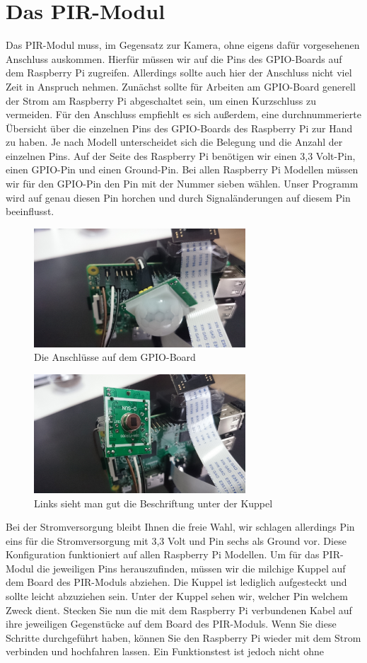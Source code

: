 \documentclass[12pt,a4paper]{scrreprt}
\begin{document}
\section{Das PIR-Modul} 
Das PIR-Modul muss, im Gegensatz zur Kamera, ohne eigens dafür vorgesehenen Anschluss auskommen. Hierfür müssen wir auf die Pins des GPIO-Boards auf dem Raspberry Pi zugreifen. Allerdings sollte auch hier der Anschluss nicht viel Zeit in Anspruch nehmen. Zunächst sollte für Arbeiten am GPIO-Board generell der Strom am Raspberry Pi abgeschaltet sein, um einen Kurzschluss zu vermeiden. Für den Anschluss empfiehlt es sich außerdem, eine durchnummerierte Übersicht über die einzelnen Pins des GPIO-Boards des Raspberry Pi zur Hand zu haben. Je nach Modell unterscheidet sich die Belegung und die Anzahl der einzelnen Pins. Auf der Seite des Raspberry Pi benötigen wir einen 3,3 Volt-Pin, einen GPIO-Pin und einen Ground-Pin. Bei allen Raspberry Pi Modellen müssen wir für den GPIO-Pin den Pin mit der Nummer sieben wählen. Unser Programm wird auf genau diesen Pin horchen und durch Signaländerungen auf diesem Pin beeinflusst. \begin{figure}[h] \centering \includegraphics[width = 7.9cm]{pir1.JPG} \caption{Die Anschlüsse auf dem GPIO-Board} \end{figure} \begin{figure}[h] \centering \includegraphics[width = 7.9cm]{pir2.JPG} \caption{Links sieht man gut die Beschriftung unter der Kuppel} \end{figure} Bei der Stromversorgung bleibt Ihnen die freie Wahl, wir schlagen allerdings Pin eins für die Stromversorgung mit 3,3 Volt und Pin sechs als Ground vor. Diese Konfiguration funktioniert auf allen Raspberry Pi Modellen. Um für das PIR-Modul die jeweiligen Pins herauszufinden, müssen wir die milchige Kuppel auf dem Board des PIR-Moduls abziehen. Die Kuppel ist lediglich aufgesteckt und sollte leicht abzuziehen sein. Unter der Kuppel sehen wir, welcher Pin welchem Zweck dient. Stecken Sie nun die mit dem Raspberry Pi verbundenen Kabel auf ihre jeweiligen Gegenstücke auf dem Board des PIR-Moduls. Wenn Sie diese Schritte durchgeführt haben, können Sie den Raspberry Pi wieder mit dem Strom verbinden und hochfahren lassen. Ein Funktionstest ist jedoch nicht ohne 
\end{document}
